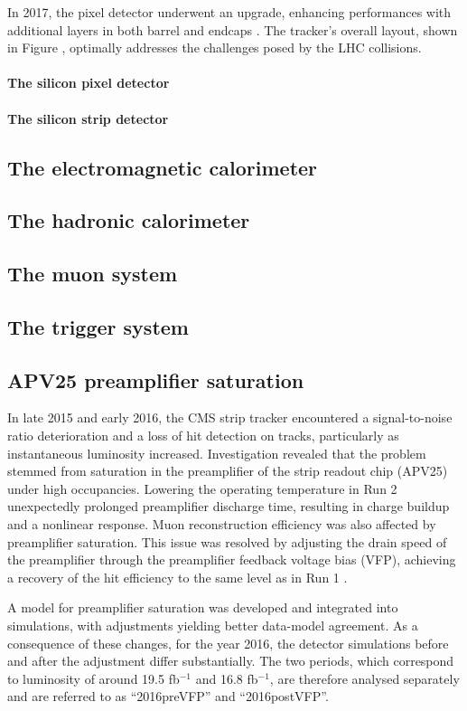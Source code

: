 In 2017, the pixel detector underwent an upgrade, enhancing performances with additional layers in both barrel and endcaps .
The tracker's overall layout, shown in Figure , optimally addresses the challenges posed by the LHC collisions.

\paragraph{The silicon pixel detector\\}
\paragraph{The silicon strip detector\\}

\subsection{The electromagnetic calorimeter}

\subsection{The hadronic calorimeter}

\subsection{The muon system}

\subsection{The trigger system}

\subsection{APV25 preamplifier saturation}
In late 2015 and early 2016, the CMS strip tracker encountered a signal-to-noise ratio deterioration and a loss of hit detection on tracks, particularly as instantaneous luminosity increased.
Investigation revealed that the problem stemmed from saturation in the preamplifier of the strip readout chip (APV25) under high occupancies.
Lowering the operating temperature in Run 2 unexpectedly prolonged preamplifier discharge time, resulting in charge buildup and a nonlinear response.
Muon reconstruction efficiency was also affected by preamplifier saturation.
This issue was resolved by adjusting the drain speed of the preamplifier \cite{Butz:2018dum} through the preamplifier feedback voltage bias (VFP), achieving a recovery of the hit efficiency to the same level as in Run 1 \cite{CMS:2021ime}.

A model for preamplifier saturation was developed and integrated into simulations, with adjustments yielding better data-model agreement.
As a consequence of these changes, for the year 2016, the detector simulations before and after the adjustment differ substantially.
The two periods, which correspond to luminosity of around 19.5 fb$^{-1}$ and 16.8 fb$^{-1}$,
are therefore analysed separately and are referred to as ``2016preVFP'' and ``2016postVFP''.

